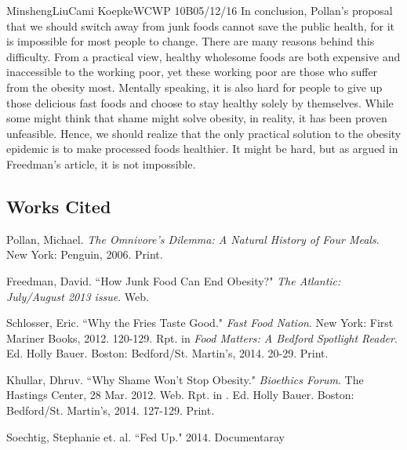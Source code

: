 \documentclass[12pt,letterpaper]{article}
\begin{document}
\begin{mla}{Minsheng}{Liu}{Cami Koepke}{WCWP 10B}{05/12/16}
In conclusion, Pollan's proposal that we should switch away from junk
foods cannot save the public health, for it is impossible for most
people to change. There are many reasons behind this difficulty. From a
practical view, healthy wholesome foods are both expensive and
inaccessible to the working poor, yet these working poor are those who
suffer from the obesity most. Mentally speaking, it is also hard for
people to give up those delicious fast foods and choose to stay healthy
solely by themselves. While some might think that shame might solve
obesity, in reality, it has been proven unfeasible. Hence, we should
realize that the only practical solution to the obesity epidemic is to
make processed foods healthier. It might be hard, but as argued in
Freedman's article, it is not impossible.


\subsection*{Works Cited}
\bibent Pollan, Michael. \textit{The Omnivore's Dilemma: A Natural History of
Four Meals}. New York: Penguin, 2006. Print.

\bibent Freedman, David. ``How Junk Food Can End Obesity?" \textit{The Atlantic:
July/August 2013 issue}.  Web.

\bibent Schlosser, Eric. ``Why the Fries Taste Good."
\textit{Fast Food Nation}. New York: First Mariner Books, 2012. 120-129. Rpt.
in \textit{Food Matters: A Bedford Spotlight Reader}. Ed. Holly Bauer. Boston:
Bedford/St. Martin's, 2014. 20-29. Print.

\bibent Khullar, Dhruv. ``Why Shame Won’t Stop Obesity." \textit{Bioethics
Forum}. The Hastings Center, 28 Mar. 2012. Web. Rpt. in
.
Ed. Holly Bauer. Boston: Bedford/St. Martin’s, 2014. 127-129. Print.

\bibent Soechtig, Stephanie et. al. ``Fed Up." 2014. Documentaray

\end{mla}
\end{document}
